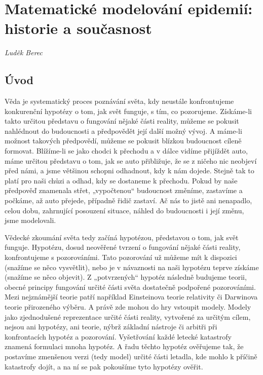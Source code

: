 \chapter[Matematické modelování epidemií]{Matematické modelování epidemií: historie a současnost}
\label{Typy_modelu}

\textit{Luděk Berec}
\vspace{15mm}

\section*{Úvod}

Věda je systematický proces poznávání světa, kdy neustále konfrontujeme konkurenční hypotézy o tom, jak svět funguje, s tím, co pozorujeme. Získáme-li takto určitou představu o fungování nějaké části reality, můžeme se pokusit nahlédnout do budoucnosti a předpovědět její další možný vývoj. A máme-li možnost takových předpovědí, můžeme se pokusit blízkou budoucnost cíleně formovat. Blížíme-li se jako chodci k přechodu a v dálce vidíme přijíždět auto, máme určitou představu o tom, jak se auto přibližuje, že se z ničeho nic neobjeví před námi, a jsme většinou schopni odhadnout, kdy k nám dojede. Stejně tak to platí pro naši chůzi a odhad, kdy se dostaneme k přechodu. Pokud by naše předpověď znamenala střet, „vypočtenou“ budoucnost změníme, zastavíme a počkáme, až auto přejede, případně řidič zastaví. Ač nás to jistě ani nenapadlo, celou dobu, zahrnující posouzení situace, náhled do budoucnosti i její změnu, jsme modelovali.

Vědecké zkoumání světa tedy začíná hypotézou, představou o tom, jak svět funguje. Hypotézu, dosud neověřené tvrzení o fungování nějaké části reality, konfrontujeme s pozorováními. Tato pozorování už můžeme mít k dispozici (snažíme se něco vysvětlit), nebo je v návaznosti na naši hypotézu teprve získáme (snažíme se něco objevit). Z „potvrzených“ hypotéz následně budujeme teorii, obecné principy fungování určité části světa dostatečně podpořené pozorováními. Mezi nejznámější teorie patří například Einsteinova teorie relativity či Darwinova teorie přirozeného výběru. A právě zde mohou do hry vstoupit modely. Modely jako zjednodušené reprezentace určité části reality, vytvořené za určitým cílem, nejsou ani hypotézy, ani teorie, nýbrž základní nástroje či arbitři při konfrontacích hypotéz a pozorování. Vyšetřování každé letecké katastrofy znamená formulaci mnoha hypotéz. A řadu těchto hypotéz ověřujeme tak, že postavíme zmenšenou verzi (tedy model) určité části letadla, kde mohlo k příčině katastrofy dojít, a na ní se pak pokoušíme tyto hypotézy ověřit.

